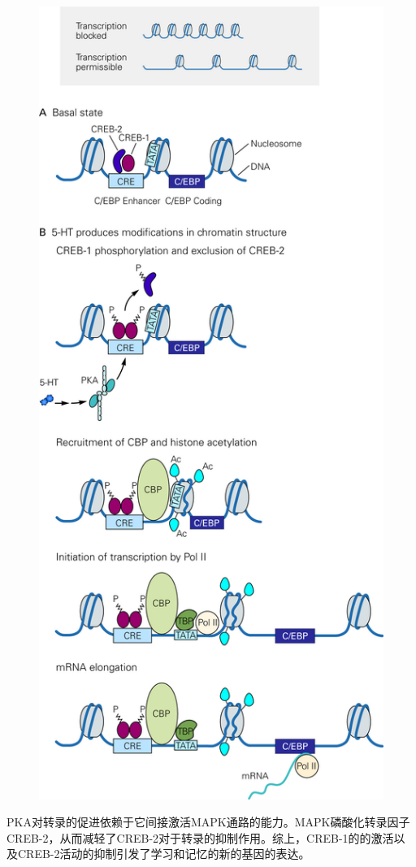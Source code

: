 \documentclass[UTF8,nofonts]{ctexart}
\begin{document}
\begin{figure}
	\centering
	\includegraphics[scale=0.9]{Pic/6607_PNS5.jpg}
\end{figure}
\par
PKA对转录的促进依赖于它间接激活MAPK通路的能力。MAPK磷酸化转录因子CREB-2，从而减轻了CREB-2对于转录的抑制作用。综上，CREB-1的的激活以及CREB-2活动的抑制引发了学习和记忆的新的基因的表达。
\end{document}
